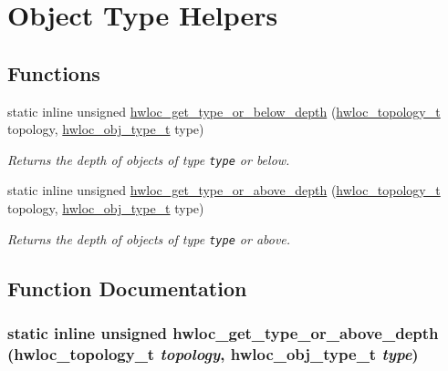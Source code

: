 \hypertarget{group__hwlocality__helper__types}{
\section{Object Type Helpers}
\label{group__hwlocality__helper__types}
}
\subsection*{Functions}
\begin{CompactItemize}
\item 
static inline unsigned \hyperlink{group__hwlocality__helper__types_ga0835c86ef2ce8c62637d61a1cf134f9}{hwloc\_\-get\_\-type\_\-or\_\-below\_\-depth} (\hyperlink{group__hwlocality__topology_g9d1e76ee15a7dee158b786c30b6a6e38}{hwloc\_\-topology\_\-t} topology, \hyperlink{group__hwlocality__types_gcd37bb612667dc437d66bfb175a8dc55}{hwloc\_\-obj\_\-type\_\-t} type)
\begin{CompactList}\small\item\em Returns the depth of objects of type {\tt type} or below. \item\end{CompactList}\item 
static inline unsigned \hyperlink{group__hwlocality__helper__types_g65a1d8f1012cb500817893ef848bc3f1}{hwloc\_\-get\_\-type\_\-or\_\-above\_\-depth} (\hyperlink{group__hwlocality__topology_g9d1e76ee15a7dee158b786c30b6a6e38}{hwloc\_\-topology\_\-t} topology, \hyperlink{group__hwlocality__types_gcd37bb612667dc437d66bfb175a8dc55}{hwloc\_\-obj\_\-type\_\-t} type)
\begin{CompactList}\small\item\em Returns the depth of objects of type {\tt type} or above. \item\end{CompactList}\end{CompactItemize}


\subsection{Function Documentation}
\hypertarget{group__hwlocality__helper__types_g65a1d8f1012cb500817893ef848bc3f1}{
\subsubsection[{hwloc\_\-get\_\-type\_\-or\_\-above\_\-depth}]{\setlength{\rightskip}{0pt plus 5cm}static inline unsigned hwloc\_\-get\_\-type\_\-or\_\-above\_\-depth ({\bf hwloc\_\-topology\_\-t} {\em topology}, \/  {\bf hwloc\_\-obj\_\-type\_\-t} {\em type})}}
\label{group__hwlocality__helper__types_g65a1d8f1012cb500817893ef848bc3f1}


